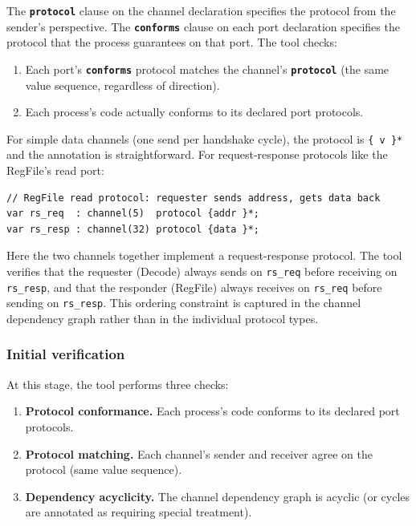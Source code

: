\documentclass[11pt]{article}
\newcommand{\keyword}[1]{\texttt{\textbf{#1}}}
\begin{document}
The \keyword{protocol} clause on the channel declaration specifies the
protocol from the sender's perspective.  The \keyword{conforms} clause
on each port declaration specifies the protocol that the process
guarantees on that port.  The tool checks:
\begin{enumerate}
\item Each port's \keyword{conforms} protocol matches the channel's
  \keyword{protocol} (the same value sequence, regardless of direction).
\item Each process's code actually conforms to its declared port
  protocols.
\end{enumerate}

For simple data channels (one send per handshake cycle), the protocol
is \texttt{\{ v \}*} and the annotation is straightforward.  For
request-response protocols like the RegFile's read port:

\begin{Verbatim}[samepage=true]
// RegFile read protocol: requester sends address, gets data back
var rs_req  : channel(5)  protocol {addr }*;
var rs_resp : channel(32) protocol {data }*;
\end{Verbatim}

Here the two channels together implement a request-response protocol.
The tool verifies that the requester (Decode) always sends on
\texttt{rs\_req} before receiving on \texttt{rs\_resp}, and that the
responder (RegFile) always receives on \texttt{rs\_req} before sending
on \texttt{rs\_resp}.  This ordering constraint is captured in the
channel dependency graph rather than in the individual protocol types.

\subsubsection{Initial verification}

At this stage, the tool performs three checks:
\begin{enumerate}
\item \textbf{Protocol conformance.} Each process's code conforms to
  its declared port protocols.
\item \textbf{Protocol matching.} Each channel's sender and receiver
  agree on the protocol (same value sequence).
\item \textbf{Dependency acyclicity.} The channel dependency graph is
  acyclic (or cycles are annotated as requiring special treatment).
\end{enumerate}
\end{document}
